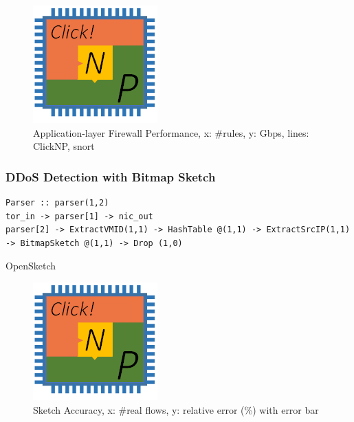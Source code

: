 {\begin{figure}[h!]
	\centering
	\includegraphics[width=0.6\columnwidth]{image/logo}
	\vspace{-0.15in}
	\caption{Application-layer Firewall Performance, x: \#rules, y: Gbps, lines: ClickNP, snort \cite{roesch1999snort}}
	\vspace{-0.15in}
	\label{fig:WAF_Performance}
\end{figure}

\subsubsection{DDoS Detection with Bitmap Sketch}

\begin{lstlisting}
Parser :: parser(1,2)
tor_in -> parser[1] -> nic_out
parser[2] -> ExtractVMID(1,1) -> HashTable @(1,1) -> ExtractSrcIP(1,1) -> BitmapSketch @(1,1) -> Drop (1,0)
\end{lstlisting}

OpenSketch \cite{yu2013software}

\begin{figure}[h!]
	\centering
	\includegraphics[width=0.6\columnwidth]{image/logo}
	\vspace{-0.15in}
	\caption{Sketch Accuracy, x: \#real flows, y: relative error (\%) with error bar}
	\vspace{-0.15in}
	\label{fig:SketchAccuracy}
\end{figure}


}
